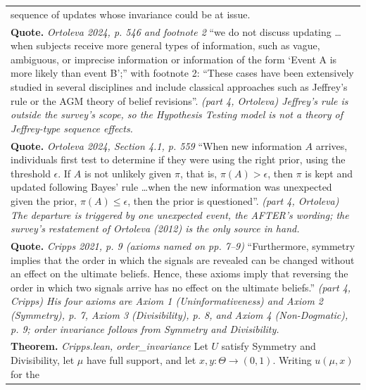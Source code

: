 \documentclass[10pt]{article}
\theoremstyle{definition}
\newlength{\fullw}\setlength{\fullw}{25.9cm}
\begin{document}
{\begin{longtable}{|p{0.9cm}|p{12.2cm}|p{12.2cm}|}
{{sequence of updates whose invariance could be at issue.}} \\
\multicolumn{3}{|p{\fullw}|}{\textbf{Quote.} \textit{Ortoleva 2024, p. 546 and footnote 2} \newline ``we do not discuss updating \ldots when subjects receive more
general types of information, such as vague, ambiguous, or imprecise
information or information of the form `Event A is more likely than event
B';'' with footnote 2: ``These cases have been extensively studied in several
disciplines and include classical approaches such as Jeffrey's rule or the AGM
theory of belief revisions''. \newline \textit{(part 4, Ortoleva) Jeffrey's rule is outside the survey's
scope, so the Hypothesis Testing model is not a theory of Jeffrey-type
sequence effects.}} \\
\multicolumn{3}{|p{\fullw}|}{\textbf{Quote.} \textit{Ortoleva 2024, Section 4.1, p. 559} \newline ``When new information $A$ arrives, individuals first test to
determine if they were using the right prior, using the threshold
$\epsilon$. If $A$ is not unlikely given $\pi$, that is, $\pi(A) > \epsilon$,
then $\pi$ is kept and updated following Bayes' rule \ldots when the new
information was unexpected given the prior, $\pi(A) \le \epsilon$, then the
prior is questioned''. \newline \textit{(part 4, Ortoleva) The departure is triggered by one unexpected
event, the AFTER's wording; the survey's restatement of Ortoleva (2012) is
the only source in hand.}} \\
\multicolumn{3}{|p{\fullw}|}{\textbf{Quote.} \textit{Cripps 2021, p. 9 (axioms named on pp. 7--9)} \newline ``Furthermore, symmetry implies that the order in which the
signals are revealed can be changed without an effect on the ultimate beliefs.
Hence, these axioms imply that reversing the order in which two signals arrive
has no effect on the ultimate beliefs.'' \newline \textit{(part 4, Cripps) His four axioms are Axiom 1 (Uninformativeness)
and Axiom 2 (Symmetry), p. 7, Axiom 3 (Divisibility), p. 8, and Axiom 4
(Non-Dogmatic), p. 9; order invariance follows from Symmetry and
Divisibility.}} \\
\multicolumn{3}{|p{\fullw}|}{\textbf{Theorem.} \textit{Cripps.lean, order\_invariance} \newline Let $U$ satisfy Symmetry and Divisibility, let $\mu$ have full
support, and let $x, y : \Theta \to (0,1)$. Writing $u(\mu,x)$ for the
}
\end{longtable}}
\end{document}
